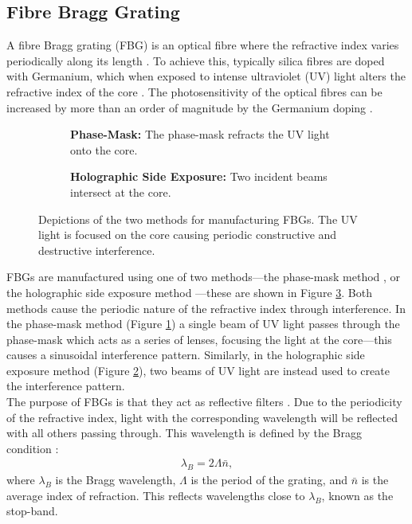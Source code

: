 \subsection{Fibre Bragg Grating}
A fibre Bragg grating (FBG) is an optical fibre where the refractive index varies periodically along its length \cite{ferreira}. To achieve this, typically silica fibres are doped with Germanium, which when exposed to intense ultraviolet (UV) light alters the refractive index of the core \cite{becker, starodoumov}. The photosensitivity of the optical fibres can be increased by more than an order of magnitude by the Germanium doping \cite{becker, ferreira}. \\

\begin{figure}[p]
\centering
\begin{subfigure}{\textwidth}
\centering

\caption{\textbf{Phase-Mask:} The phase-mask refracts the UV light onto the core.}
\label{fig:phasemask}
\vspace{10mm}
\end{subfigure}
\begin{subfigure}{\textwidth}
\centering

\caption{\textbf{Holographic Side Exposure:} Two incident beams intersect at the core.}
\label{fig:holographic}
\end{subfigure}
\caption{Depictions of the two methods for manufacturing FBGs. The UV light is focused on the core causing periodic constructive and destructive interference.}
\label{fig:fbgmake}
\end{figure}

FBGs are manufactured using one of two methods---the phase-mask method \cite{agrawal2002,alazzawi,becker,starodoumov}, or the holographic side exposure method \cite{agrawal2002, alazzawi, becker, ferreira, starodoumov}---these are shown in Figure \ref{fig:fbgmake}. Both methods cause the periodic nature of the refractive index through interference. In the phase-mask method (Figure \ref{fig:phasemask}) a single beam of UV light passes through the phase-mask which acts as a series of lenses, focusing the light at the core---this causes a sinusoidal interference pattern. Similarly, in the holographic side exposure method (Figure \ref{fig:holographic}), two beams of UV light are instead used to create the interference pattern. \\

The purpose of FBGs is that they act as reflective filters \cite{agrawal2002, alazzawi, ferreira, starodoumov}. Due to the periodicity of the refractive index, light with the corresponding wavelength will be reflected with all others passing through. This wavelength is defined by the Bragg condition \cite{agrawal2002, alazzawi, becker, ferreira, silfvast, starodoumov}:
\begin{align}
\label{eq:bragg}
\lambda_B = 2 \Lambda \bar{n},
\end{align}
where $\lambda_B$ is the Bragg wavelength, $\Lambda$ is the period of the grating, and $\bar{n}$ is the average index of refraction. This reflects wavelengths close to $\lambda_B$, known as the stop-band. \\

